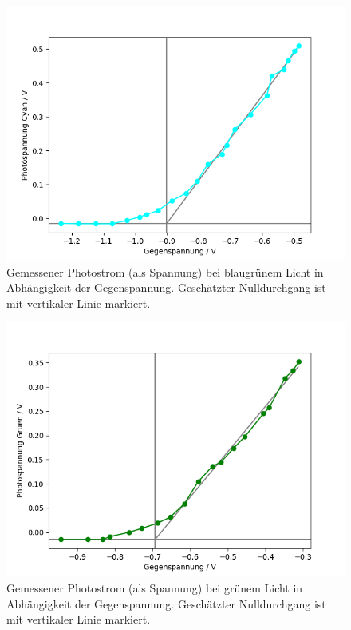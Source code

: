 \documentclass{article}
\begin{document}
\newpage
\begin{figure}[H]
 \includegraphics[scale=0.6]{cyan.png}
\caption{Gemessener Photostrom (als Spannung) bei blaugrünem Licht in Abhängigkeit der Gegenspannung. Geschätzter Nulldurchgang ist mit vertikaler Linie markiert.}
\label{fig:daten_cyan}
\end{figure}
\begin{figure}[H]
\includegraphics[scale=0.6]{green.png}
\caption{Gemessener Photostrom (als Spannung) bei grünem Licht in Abhängigkeit der Gegenspannung. Geschätzter Nulldurchgang ist mit vertikaler Linie markiert.}
\label{fig:daten_green}
\end{figure}
\newpage
\end{document}
